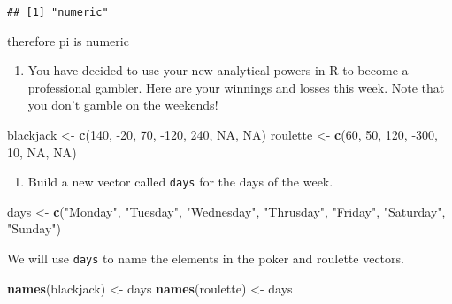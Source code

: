 \documentclass[]{article}
\newenvironment{Shaded}{\begin{snugshade}}{\end{snugshade}}
\newcommand{\DecValTok}[1]{\textcolor[rgb]{0.00,0.00,0.81}{#1}}
\newcommand{\KeywordTok}[1]{\textcolor[rgb]{0.13,0.29,0.53}{\textbf{#1}}}
\newcommand{\NormalTok}[1]{#1}
\newcommand{\OtherTok}[1]{\textcolor[rgb]{0.56,0.35,0.01}{#1}}
\newcommand{\StringTok}[1]{\textcolor[rgb]{0.31,0.60,0.02}{#1}}
\providecommand{\tightlist}{%
  \setlength{\itemsep}{0pt}\setlength{\parskip}{0pt}}
\begin{document}
\begin{verbatim}
## [1] "numeric"
\end{verbatim}

therefore pi is numeric

\begin{enumerate}
\def\labelenumi{\arabic{enumi}.}
\setcounter{enumi}{4}
\tightlist
\item
  You have decided to use your new analytical powers in R to become a
  professional gambler. Here are your winnings and losses this week.
  Note that you don't gamble on the weekends!
\end{enumerate}

\begin{Shaded}
\begin{Highlighting}[]
\NormalTok{blackjack <-}\StringTok{ }\KeywordTok{c}\NormalTok{(}\DecValTok{140}\NormalTok{, }\DecValTok{-20}\NormalTok{, }\DecValTok{70}\NormalTok{, }\DecValTok{-120}\NormalTok{, }\DecValTok{240}\NormalTok{, }\OtherTok{NA}\NormalTok{, }\OtherTok{NA}\NormalTok{)}
\NormalTok{roulette <-}\StringTok{ }\KeywordTok{c}\NormalTok{(}\DecValTok{60}\NormalTok{, }\DecValTok{50}\NormalTok{, }\DecValTok{120}\NormalTok{, }\DecValTok{-300}\NormalTok{, }\DecValTok{10}\NormalTok{, }\OtherTok{NA}\NormalTok{, }\OtherTok{NA}\NormalTok{)}
\end{Highlighting}
\end{Shaded}

\begin{enumerate}
\def\labelenumi{\alph{enumi}.}
\tightlist
\item
  Build a new vector called \texttt{days} for the days of the week.
\end{enumerate}

\begin{Shaded}
\begin{Highlighting}[]
\NormalTok{days <-}\StringTok{ }\KeywordTok{c}\NormalTok{(}\StringTok{"Monday"}\NormalTok{, }\StringTok{"Tuesday"}\NormalTok{, }\StringTok{"Wednesday"}\NormalTok{, }\StringTok{"Thrusday"}\NormalTok{, }\StringTok{"Friday"}\NormalTok{, }\StringTok{"Saturday"}\NormalTok{, }\StringTok{"Sunday"}\NormalTok{)}
\end{Highlighting}
\end{Shaded}

We will use \texttt{days} to name the elements in the poker and roulette
vectors.

\begin{Shaded}
\begin{Highlighting}[]
\KeywordTok{names}\NormalTok{(blackjack) <-}\StringTok{ }\NormalTok{days}
\KeywordTok{names}\NormalTok{(roulette) <-}\StringTok{ }\NormalTok{days}
\end{Highlighting}
\end{Shaded}
\end{document}

